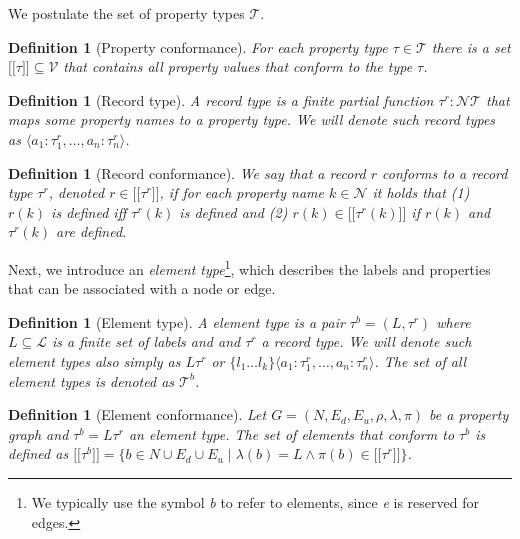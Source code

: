 \documentclass[a4paper]{article}
\makeatletter
\newtheorem{definition}[theorem]{Definition}
\newcommand{\ptype}{\tau}
\newcommand{\ptypes}{\mathcal{T}}
\newcommand{\rtype}{\tau^r}
\newcommand{\btype}{\tau^b}
\newcommand{\btypes}{\mathcal{T}^b}
\newcommand{\lsem}{\ensuremath{[\![}}
\newcommand{\rsem}{\ensuremath{]\!]}}
\newcommand{\sem}[1]{\ensuremath{\lsem #1 \rsem}}
\newcommand{\pto}{}%
\DeclareRobustCommand{\pto}{\mathrel{\mathpalette\p@to@gets\to}}
\newcommand{\p@to@gets}[2]{%
  \ooalign{\hidewidth$\m@th#1\mapstochar\mkern5mu$\hidewidth\cr$\m@th#1\to$\cr}%
}
\makeatother
\begin{document}
We postulate the set of property types $\mathcal{T}$.

\begin{definition}[Property conformance]
  For each property type $\ptype \in \ptypes$ there is a set $\sem{\ptype} \subseteq \mathcal{V}$ that contains all property values that \emph{conform} to the type $\ptype$.
\end{definition}

\begin{definition}[Record type]
  A \emph{record type} is a finite partial function $\rtype : \mathcal{N} \pto \ptypes$ that maps some property names to a property type. We will denote such record types as $\langle a_1 : \rtype_1, \ldots, a_n : \rtype_n \rangle$.
\end{definition}

\begin{definition}[Record conformance]
  We say that a record $r$ \emph{conforms} to a record type $\rtype$, denoted $r \in \sem{\rtype}$, if for each property name $k \in \mathcal{N}$ it holds that (1) $r(k)$ is defined iff $\rtype(k)$ is defined and (2) $r(k) \in \sem{\rtype(k)}$ if $r(k)$ and $\rtype(k)$ are defined.
\end{definition}

Next, we introduce an \emph{element type}\footnote{We typically use the symbol \emph{b} to refer to elements, since \emph{e} is reserved for edges.}, which describes the labels and properties that can be associated with a node or edge.

\begin{definition}[Element type]
  A \emph{element type} is a pair $\btype = (L, \rtype)$ where $L \subseteq \mathcal{L}$ is a finite set of labels and and $\rtype$ a record type. We will denote such element types also simply as $L\rtype$ or $\{ l_1 \ldots l_k \} \langle a_1 : \rtype_1, \ldots, a_n : \rtype_n \rangle$. The set of all element types is denoted as $\btypes$.
\end{definition}

\begin{definition}[Element conformance]
  Let $G = (N, E_d, E_u, \rho, \lambda, \pi)$ be a property graph and $\btype = L\rtype$ an element type. The set of elements that \emph{conform} to $\btype$ is defined as $\sem{\btype} = \{b \in N \cup E_d \cup E_u \mid \lambda(b) = L \wedge \pi(b) \in \sem{\rtype}\}$.
\end{definition}
\end{document}
